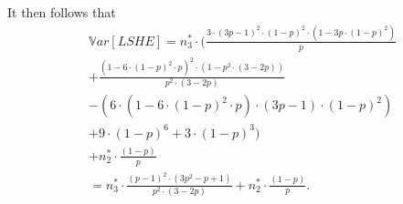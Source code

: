 \documentclass[aoas]{imsart}
\begin{document}
It then follows that
\begin{equation*}
\begin{split}
&\mathbb{V}ar[LSHE]=n_3^*\cdot\Big(\frac{3\cdot(3p-1)^2\cdot(1-p)^2\cdot(1-3p\cdot(1-p)^2)}{p}\\
&+\frac{(1-6\cdot(1-p)^2\cdot p)^2\cdot(1-p^2\cdot(3-2p))}{p^2\cdot(3-2p)}\\
&-(6\cdot(1-6\cdot(1-p)^2\cdot p)\cdot(3p-1)\cdot(1-p)^2)\\
&+ 9\cdot(1-p)^6+3\cdot(1-p)^3 \Big)\\
&+ n_2^*\cdot\frac{(1-p)}{p}\\
&= n_3^* \cdot \frac{(p-1)^2 \cdot (3p^2-p+1)}{p^2 \cdot (3-2p)} + n_2^* \cdot \frac{(1-p)}{p}.
\end{split}
\end{equation*}
\end{document}
